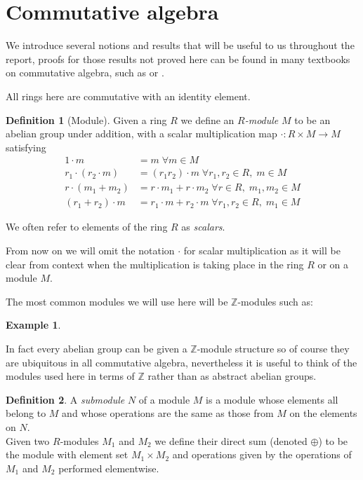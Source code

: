 \documentclass[a4paper,abstracton]{scrreprt}
\theoremstyle{definition}
\newtheorem{defn}{Definition}
\newtheorem{ex}{Example}
\newcommand{\ZZ}{\mathbb{Z}}
\begin{document}
\section{Commutative algebra}
We introduce several notions and results that will be useful to us throughout the report, proofs for those results not proved here can be found in many textbooks on commutative algebra, such as \cite{am} or \cite{matsumura}.

All rings here are commutative with an identity element.
\begin{defn}[Module]
Given a ring $R$ we define an \emph{$R$-module} $M$ to be an abelian group under addition, with a scalar multiplication map $\cdot \colon R\times M \to M$ satisfying
\begin{align*}
1\cdot m &= m \; \forall m\in M \\
r_1\cdot(r_2 \cdot m) &= (r_1r_2)\cdot m \; \forall r_1,r_2\in R,\; m\in M \\
r\cdot(m_1 + m_2) &= r\cdot m_1 + r\cdot m_2 \; \forall r\in R, \; m_1,m_2\in M \\
(r_1 + r_2)\cdot m &= r_1\cdot m + r_2\cdot m \; \forall r_1,r_2\in R, \; m_1\in M
\end{align*}
\end{defn}

We often refer to elements of the ring $R$ as \emph{scalars}.

From now on we will omit the notation $\cdot$ for scalar multiplication as it will be clear from context when the multiplication is taking place in the ring $R$ or on a module $M$.

The most common modules we will use here will be $\ZZ$-modules such as:
\begin{ex}

\end{ex}
In fact every abelian group can be given a $\ZZ$-module structure so of course they are ubiquitous in all commutative algebra, nevertheless it is useful to think of the modules used here in terms of $\ZZ$ rather than as abstract abelian groups.\\

\begin{defn}
A \emph{submodule} $N$ of a module $M$ is a module whose elements all belong to $M$ and whose operations are the same as those from $M$ on the elements on $N$.\\
Given two $R$-modules $M_1$ and $M_2$ we define their direct sum (denoted $\oplus$) to be the module with element set $M_1 \times M_2$ and operations given by the operations of $M_1$ and $M_2$ performed elementwise.
\end{defn}
\end{document}
